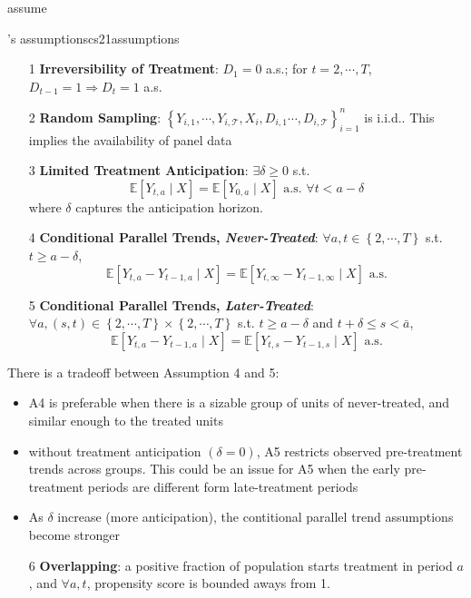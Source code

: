 \documentclass[twoside]{article}
\begin{document}
\citet{callaway2021difference} assume 
\begin{assumption}{\citet{callaway2021difference}'s assumptions}{cs21assumptions}
    \begin{itemize}
        \item[1] \textbf{Irreversibility of Treatment}: $D_1=0$ a.s.; for $t=2,\cdots,T$, $D_{t-1}=1\Rightarrow D_t=1$ a.s.
        \item[2] \textbf{Random Sampling}: $\left\{Y_{i,1},\cdots,Y_{i,\mathcal{T}},X_i,D_{i,1} \cdots, D_{i,\mathcal{T}}\right\}^n_{i=1}$ is i.i.d.. This implies the availability of panel data
        \item[3] \textbf{Limited Treatment Anticipation}: $\exists \delta \geq 0$ s.t. $$ \mathbb{E}\left[Y_{t,a}\mid X \right] = \mathbb{E}\left[Y_{0,a}\mid X\right] \text{ a.s. }\forall t< a-\delta $$
        where $\delta$ captures the anticipation horizon.
        \item[4] \textbf{Conditional Parallel Trends, \textit{Never-Treated}}: $\forall a, t\in\left\{2,\cdots,T\right\}$ s.t. $t\geq a-\delta$, $$ \mathbb{E}\left[Y_{t,a}-Y_{t-1,a}\mid X\right] = \mathbb{E}\left[ Y_{t,\infty}-Y_{t-1,\infty}\mid X \right] \text{ a.s.}$$
        \item[5] \textbf{Conditional Parallel Trends, \textit{Later-Treated}}: $\forall a, (s,t)\in\left\{2,\cdots,T\right\}\times \left\{2,\cdots,T\right\}$ s.t. $t\geq a-\delta$ and $t+\delta\leq s< \bar{a}$, $$ \mathbb{E}\left[Y_{t,a}-Y_{t-1,a}\mid X\right] = \mathbb{E}\left[ Y_{t,s}-Y_{t-1,s} \mid X \right] \text{ a.s.} $$
    \end{itemize}
    There is a tradeoff between Assumption 4 and 5:
    \begin{itemize}
        \item A4 is preferable when there is a sizable group of units of never-treated, and similar enough to the treated units
        \item without treatment anticipation $(\delta = 0)$, A5 restricts observed pre-treatment trends across groups. This could be an issue for A5 when the early pre-treatment periods are different form late-treatment periods
        \item As $\delta$ increase (more anticipation), the contitional parallel trend assumptions become stronger
    \end{itemize}
    \begin{itemize}
        \item[6] \textbf{Overlapping}: a positive fraction of population starts treatment in period $a$, and $\forall a,t$, propensity score is bounded aways from 1.
    \end{itemize}
\end{assumption}
\end{document}
